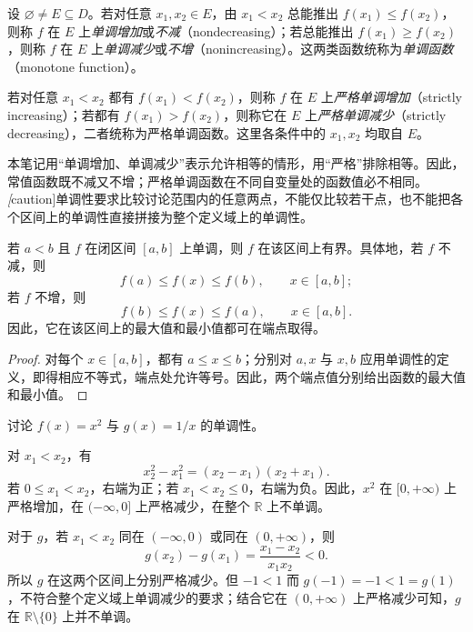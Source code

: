 \documentclass[UTF8,12pt,a4paper,fontset=fandol]{ctexbook}
\begin{document}
\begin{definition}
\label{def:monotone-functions}
设 $\varnothing\neq E\subseteq D$。若对任意 $x_1,x_2\in E$，由 $x_1<x_2$ 总能推出 $f(x_1)\leq f(x_2)$，则称 $f$ 在 $E$ 上\emph{单调增加}或\emph{不减}（nondecreasing）；若总能推出 $f(x_1)\geq f(x_2)$，则称 $f$ 在 $E$ 上\emph{单调减少}或\emph{不增}（nonincreasing）。这两类函数统称为\emph{单调函数}（monotone function）。

若对任意 $x_1<x_2$ 都有 $f(x_1)<f(x_2)$，则称 $f$ 在 $E$ 上\emph{严格单调增加}（strictly increasing）；若都有 $f(x_1)>f(x_2)$，则称它在 $E$ 上\emph{严格单调减少}（strictly decreasing），二者统称为严格单调函数。这里各条件中的 $x_1,x_2$ 均取自 $E$。
\end{definition}

本笔记用“单调增加、单调减少”表示允许相等的情形，用“严格”排除相等。因此，常值函数既不减又不增；严格单调函数在不同自变量处的函数值必不相同。\emph[caution]{单调性要求比较讨论范围内的任意两点，不能仅比较若干点，也不能把各个区间上的单调性直接拼接为整个定义域上的单调性。}

\begin{proposition}
\label{prop:monotone-function-endpoint-bounds}
若 $a<b$ 且 $f$ 在闭区间 $[a,b]$ 上单调，则 $f$ 在该区间上有界。具体地，若 $f$ 不减，则
\[
    f(a)\leq f(x)\leq f(b),\qquad x\in[a,b];
\]
若 $f$ 不增，则
\[
    f(b)\leq f(x)\leq f(a),\qquad x\in[a,b].
\]
因此，它在该区间上的最大值和最小值都可在端点取得。
\end{proposition}

\begin{proof}
对每个 $x\in[a,b]$，都有 $a\leq x\leq b$；分别对 $a,x$ 与 $x,b$ 应用单调性的定义，即得相应不等式，端点处允许等号。因此，两个端点值分别给出函数的最大值和最小值。
\end{proof}

\begin{example}
\label{ex:monotonicity-on-subsets}
讨论 $f(x)=x^2$ 与 $g(x)=1/x$ 的单调性。
\end{example}

\begin{solve}
对 $x_1<x_2$，有
\[
    x_2^2-x_1^2=(x_2-x_1)(x_2+x_1).
\]
若 $0\leq x_1<x_2$，右端为正；若 $x_1<x_2\leq 0$，右端为负。因此，$x^2$ 在 $[0,+\infty)$ 上严格增加，在 $(-\infty,0]$ 上严格减少，在整个 $\mathbb{R}$ 上不单调。

对于 $g$，若 $x_1<x_2$ 同在 $(-\infty,0)$ 或同在 $(0,+\infty)$，则
\[
    g(x_2)-g(x_1)=\frac{x_1-x_2}{x_1x_2}<0.
\]
所以 $g$ 在这两个区间上分别严格减少。但 $-1<1$ 而 $g(-1)=-1<1=g(1)$，不符合整个定义域上单调减少的要求；结合它在 $(0,+\infty)$ 上严格减少可知，$g$ 在 $\mathbb{R}\setminus\{0\}$ 上并不单调。
\end{solve}
\end{document}
